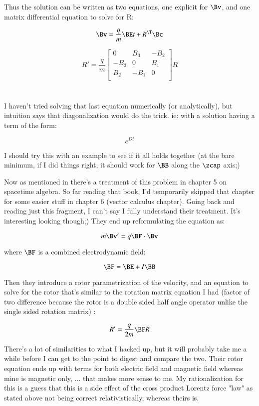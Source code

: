 Thus the solution can be written as two equations, one explicit for $\Bv$, and one matrix differential equation to solve for R:

\[
\Bv = \frac{q}{m} \BE t + R^\T \Bc
\]

\[
R' = \frac{q}{m}
\begin{bmatrix}
0 & B_3 & -B_2 \\
-B_3 & 0 & B_1 \\
B_2 & -B_1 & 0 \\
\end{bmatrix}
R
\]

\section{}

I haven't tried solving that last equation numerically (or analytically), but intuition says that diagonalization would do the trick.  ie: with a solution having a term of the form:

\[
e^{Dt}
\]

I should try this with an example to see if it all holds together (at the bare minimum, if I did things right, it should work for $\BB$ along the $\zcap$ axis;)

Now as mentioned in \cite{doran2003gap}
there's a treatment of this problem 
in chapter 5 on spacetime algebra.  So far reading that book, I'd temporarily skipped that chapter for some easier stuff in chapter 6 (vector calculus chapter).  Going back and reading just this fragment, I can't say I fully understand their treatment.  It's interesting looking though;)  They end up reformulating the equation as:

\[
m \Bv' = q \BF \cdot \Bv
\]

where $\BF$ is a combined electrodynamic field:

\[
\BF = \BE + I \BB
\]

Then they introduce a rotor parametrization of the velocity, and an equation to solve for the rotor that's similar to the rotation matrix equation I had (factor of two difference because the rotor is a double sided half angle operator unlike the single sided rotation matrix) :

\[
R' = \frac{q}{2m} \BF R
\]

There's a lot of similarities to what I hacked up, but it will probably take me a while before I can get to the point to digest and compare the two.   Their rotor equation ends up with terms for both electric field and magnetic field whereas mine is magnetic only, ... that makes more sense to me.  My rationalization for this is a guess that this is a side effect of the cross product Lorentz force "law" as stated above not being correct relativistically, whereas theirs is.

